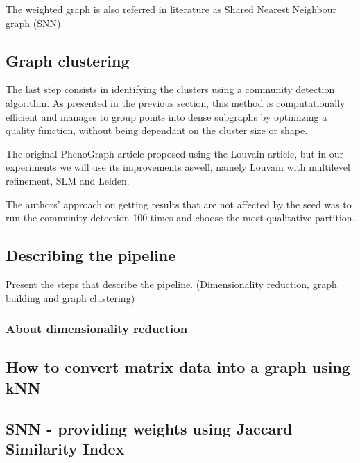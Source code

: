     The weighted graph is also referred in literature as Shared Nearest Neighbour graph (SNN).
    


    \subsection{Graph clustering}
    The last step consists in identifying the clusters using a community detection algorithm. As presented in the previous section, this method is computationally efficient and manages to group points into dense subgraphs by optimizing a quality function, without being dependant on the cluster size or shape.

    The original PhenoGraph article proposed using the Louvain article, but in our experiments we will use its improvements aswell, namely Louvain with multilevel refinement, SLM and Leiden. 

    The authors' approach on getting results that are not affected by the seed was to run the community detection 100 times and choose the most qualitative partition.

    \subsection{Describing the pipeline}
    Present the steps that describe the pipeline. (Dimensionality reduction, graph building and graph clustering)
    \subsubsection{About dimensionality reduction}
    
    \subsection{How to convert matrix data into a graph using kNN}
    \subsection{SNN - providing weights using Jaccard Similarity Index}
    

